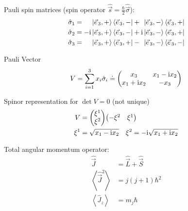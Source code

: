			\noindent
			Pauli spin matrices (spin operator $\hat{\vec{s}} = \frac{\hbar}{2} \hat{\vec{\sigma}}$):
			\begin{equation}
				\begin{aligned}
					\hat{\sigma}_1 &= \phantom{-\i}\Ket{\vec{e}_3,+} \Bra{\vec{e}_3,-} + \phantom{\i}\Ket{\vec{e}_3,-} \Bra{\vec{e}_3,+} \\
					\hat{\sigma}_2 &= -\i\Ket{\vec{e}_3,+} \Bra{\vec{e}_3,-} + \i\Ket{\vec{e}_3,-} \Bra{\vec{e}_3,+} \\
					\hat{\sigma}_3 &= \phantom{-\i}\Ket{\vec{e}_3,+} \Bra{\vec{e}_3,+} - \phantom{\i}\Ket{\vec{e}_3,-} \Bra{\vec{e}_3,-} \\
				\end{aligned}
			\end{equation}

			\noindent
			Pauli Vector
			\begin{equation}
				V
				= \sum_{i=1}^3 x_i \hat{\sigma}_i
				\doteq \left( \begin{matrix}
						x_3          & x_1 - \mathrm{i} x_2 \\
						x_1 + \mathrm{i} x_2 & - x_3        \\
					\end{matrix} \right)
			\end{equation}

			\noindent
			Spinor representation for $\det V = 0$ (not unique)
			\begin{equation}
				\begin{aligned}
					V &= \mqty(\xi^1\\\xi^2) \mqty(-\xi^2&\xi^1) \\
					\xi^1 &= \sqrt{x_1 - \i x_2} \quad \xi^2 = -\i \sqrt{x_1 + \i x_2} \\
				\end{aligned}
			\end{equation}


			\noindent
			Total angular momentum operator:
			\begin{equation}
				\begin{aligned}
					\hat{\vec{J}} &= \hat{\vec{L}} + \hat{\vec{S}} \\
					\left< \hat{\vec{J}}^2 \right> &= j(j+1)\hbar^2 \\
					\left< \hat{J}_z \right> &= m_j\hbar \\
				\end{aligned}
			\end{equation}

